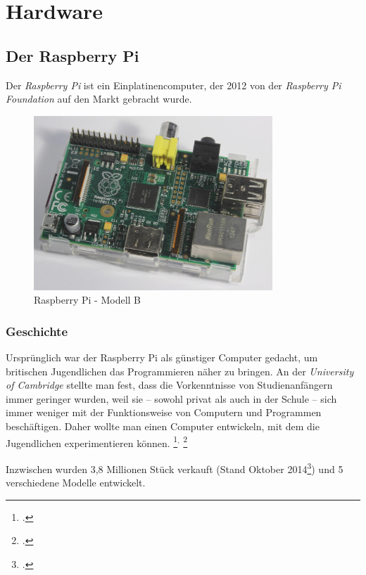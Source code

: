 \chapter{Hardware}
\label{cha:Hardware}

\section{Der Raspberry Pi}
\label{sec:Raspberry}
Der \emph{Raspberry Pi} ist ein \gls{Einplatinencomputer}, der 2012 von der \emph{Raspberry Pi Foundation} auf den Markt gebracht wurde.

\begin{figure}[h]
  \centering
     \includegraphics[width=0.8\textwidth]{figures/raspberry.jpg}
 \caption[Raspberry Pi - Modell B]{Raspberry Pi - Modell B}
  \label{fig:raspberry}
\end{figure}

\subsection{Geschichte}
\label{subsec:Geschichte}
Ursprünglich war der Raspberry Pi als günstiger Computer gedacht, um britischen Jugendlichen das Programmieren näher zu bringen. An der \emph{University of Cambridge} stellte man fest, dass die Vorkenntnisse von Studienanfängern immer geringer wurden, weil sie -- sowohl privat als auch in der Schule -- sich immer weniger mit der Funktionsweise von Computern und Programmen beschäftigen. Daher wollte man einen Computer entwickeln, mit dem die Jugendlichen experimentieren können.
\footcite{aboutraspberry}$^,$
\footcite[Geschichte]{wiki:raspberry}

Inzwischen wurden 3,8 Millionen Stück verkauft (Stand Oktober 2014\footcite{verkauf}) und 5 verschiedene Modelle entwickelt.

